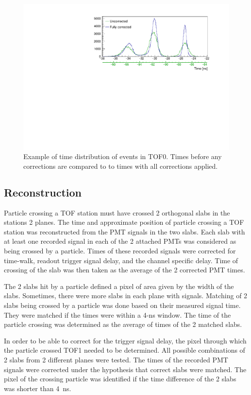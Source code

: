 \begin{figure}[!ht]
  \centering
  \includegraphics[width=0.8\columnwidth]{04_tof0_corrected_vs_uncorrected}
  \caption{Example of time distribution of events in TOF0. Times
    before any corrections are compared to to times with all
    corrections applied.}
  \label{fig:tof0times}
\end{figure}

\subsection{Reconstruction}

Particle crossing a TOF station must have crossed 2 orthogonal slabs
in the stations 2 planes.  The time and approximate position of
particle crossing a TOF station was reconstructed from the PMT signals
in the two slabs. Each slab with at least one recorded signal in each
of the 2 attached PMTs was considered as being crossed by a
particle. Times of these recorded signals were corrected for
time-walk, readout trigger signal delay, and the channel specific
delay. Time of crossing of the slab was then taken as the average of
the 2 corrected PMT times.

The 2 slabs hit by a particle defined a pixel of area given by the
width of the slabs. Sometimes, there were more slabs in each plane
with signals. Matching of 2 slabs being crossed by a particle was done
based on their measured signal time. They were matched if the times
were within a 4-ns window. The time of the particle crossing was
determined as the average of times of the 2 matched slabs.


In order to be able to correct for the trigger signal delay, the pixel
through which the particle crossed TOF1 needed to be determined. All
possible combinations of 2 slabs from 2 different planes were
tested. The times of the recorded PMT signals were corrected under the
hypothesis that correct slabs were matched. The pixel of the crossing
particle was identified if the time difference of the 2 slabs was
shorter than 4~ns.


